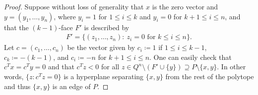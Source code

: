 \documentclass[11pt,a4paper,oneside,reqno]{amsart}
\begin{document}
\begin{proof}
  Suppose without loss of generality that $x$ is the zero vector and $y=(y_1, \dotsc, y_n)$, where $y_i=1$ for $1\leq i \leq k$ and $y_i=0$ for $k+1\leq i \leq n$, and that the $(k-1)$-face $F'$ is described by
  \begin{align*}
    F' = \bigl\{(z_1,\ldots,z_n):\: z_i=0 \text{ for } k\leq i \leq n\bigr\}.
  \end{align*}
  Let $c=(c_1,\ldots,c_n)$ be the vector given by $c_i \coloneqq 1$ if $1\leq i \leq k-1$, $c_k \coloneqq -(k-1)$, and $c_i \coloneqq -n$ for $k+1\leq i \leq n$.
  One can easily check that $c^Tx=c^Ty=0$ and that $c^Tz<0$ for all $z \in Q^n \setminus (F' \cup \{y\}) \supseteq P \setminus \{x, y\}$.
  In other words, $\{z : c^Tz=0\}$ is a hyperplane separating $\{x, y\}$ from the rest of the polytope and thus $\{x,y\}$ is an edge of $P$. 
\end{proof}
\end{document}
